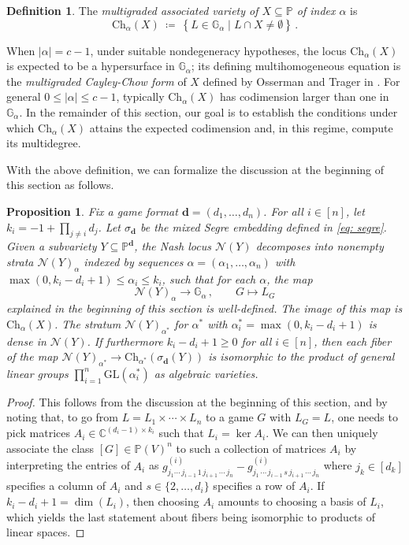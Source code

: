 \documentclass[12pt]{article}
\newtheorem{proposition}[theorem]{Proposition}
\theoremstyle{definition}
\newtheorem{definition}[theorem]{Definition}
\newcommand{\C}{{\mathbb C}}
\newcommand{\G}{{\mathbb G}}
\newcommand{\PP}{{\mathbb P}}
\def\bd{{\boldsymbol{d}}}
\newcommand{\kn}{{\mathcal N}}
\begin{document}
\begin{definition}\label{def: multigraded associated variety}
The {\em multigraded associated variety of $X\subseteq\PP$ of index $\alpha$} is
\[
    \mathrm{Ch}_\alpha(X)\ \coloneqq\ \left\{L\in \G_\alpha \mid L\cap X\neq\emptyset\right\}\,.
\]
\end{definition}

When $|\alpha|=c-1$, under suitable nondegeneracy hypotheses, the locus $\mathrm{Ch}_\alpha(X)$ is expected to be a hypersurface in $\G_\alpha$; its defining multihomogeneous equation is the {\em multigraded Cayley-Chow form} of $X$ defined by Osserman and Trager in \cite{osserman2019multigraded}. For general $0\le |\alpha|\le c-1$, typically $\mathrm{Ch}_\alpha(X)$ has codimension larger than one in $\G_\alpha$. In the remainder of this section, our goal is to establish the conditions under which $\mathrm{Ch}_\alpha(X)$ attains the expected codimension and, in this regime, compute its multidegree.

\medskip

With the above definition, we can formalize the discussion at the beginning of this section as follows.

\begin{proposition}\label{prop: multigraded vs Nash locus}
Fix a game format $\bd=(d_1,\ldots,d_n)$.
For all $i\in[n]$, let $k_i = -1+\prod_{j\neq i}d_j$. Let $\sigma_\bd$ be the mixed Segre embedding defined in \eqref{eq: segre}. Given a subvariety $Y\subseteq \PP^\bd$, the Nash locus $\kn(Y)$ decomposes into nonempty strata $\kn(Y)_\alpha$ indexed by sequences $\alpha=(\alpha_1,\dots,\alpha_n)$ with $\max(0,k_i-d_i+1)\leq \alpha_i\leq k_i$, such that for each $\alpha$, the map
\[
    \kn(Y)_\alpha\to \G_\alpha\,,\qquad G\mapsto L_G
\]
explained in the beginning of this section
is well-defined. The image of this map is $\mathrm{Ch}_\alpha(X)$. The stratum $\kn(Y)_{\alpha^*}$ for ${\alpha^*}$ with $\alpha_i^*=\max(0,k_i-d_i+1)$ is dense in $\kn(Y)$. If furthermore $k_i-d_i+1\geq 0$ for all $i\in [n]$, then each fiber of the map $\kn(Y)_{\alpha^*}\to \mathrm{Ch}_{\alpha^*}(\sigma_\bd(Y))$ is isomorphic to the product of general linear groups $\prod_{i=1}^n\mathrm{GL}({\alpha_i^*})$ as algebraic varieties.
\end{proposition}
\begin{proof}
This follows from the discussion at the beginning of this section, and by noting that, to go from $L=L_1\times \cdots\times L_n$ to a game $G$ with $L_G=L$, one needs to pick matrices $A_i\in \C^{(d_i-1)\times k_i}$ such that $L_i=\ker A_i$. We can then uniquely associate the class $[G]\in \PP(V)^n$ to such a collection of matrices $A_i$ by interpreting the entries of $A_i$ as $g^{(i)}_{j_1\cdots\,j_{i-1}\,1\,j_{i+1}\,\cdots\,j_n}-g^{(i)}_{j_1\,\cdots\,j_{i-1}\,s\,j_{i+1}\,\cdots\,j_n}$ where $j_k\in [d_k]$ specifies a column of $A_i$ and $s\in\{2,\ldots,d_i\}$ specifies a row of $A_i$. If $k_i-d_i+1=\dim(L_i)$, then choosing $A_i$ amounts to choosing a basis of $L_i$, which yields the last statement about fibers being isomorphic to products of linear spaces.
\end{proof}
\end{document}

